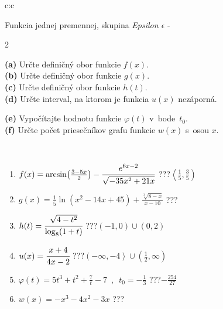 \documentclass[10pt]{report}
\begin{document}
\begin{tabular}{c:c}
\begin{minipage}[c][104.5mm][t]{0.5\linewidth}
\begin{center}
\vspace{7mm}
{\huge Funkcia jednej premennej, skupina \textit{Epsilon $\epsilon$} -}\\[5mm]
\begin{minipage}{0.95\linewidth}
\begin{center}
{\small \begin{multicols}{2} \raggedright
\textbf{(a)} Určte definičný obor funkcie \(f(x)\). \\[1mm]
\textbf{(b)} Určte definičný obor funkcie \(g(x)\). \\[1mm]
\textbf{(c)} Určte definičný obor funkcie \(h(t)\). \\[1mm]
\textbf{(d)} Určte interval, na ktorom je funkcia \(u(x)\) nezáporná. \par \columnbreak
\textbf{(e)} Vypočítajte hodnotu funkcie \(\varphi(t)\) v~bode~\(t_0\). \\[1mm]
\textbf{(f)} Určte počet priesečníkov grafu funkcie \(w(x)\) s~osou \(x\). \\[1mm]
\end{multicols}
}
\end{center}
\end{minipage}
\\[4mm]
\begin{minipage}{0.79\linewidth}
\begin{center}
\begin{varwidth}{\linewidth}
\begin{enumerate}
\small
\item $f(x) = \arcsin\!\left( \frac{3-5x}{2} \right) - \cfrac{e^{6x-2}}{\sqrt{-35x^2+21x}}$\quad \dotfill\; ???\;\dotfill \quad $\left\langle\frac{1}{5} , \frac{3}{5}\right)$
\item $g(x) = \frac{1}{5} \ln{\!(x^2-14x+45)}+\frac{\sqrt[3]{8-x}}{x-10}$\quad \dotfill\; ???\;\dotfill {}
\item $h(t) = \cfrac{\sqrt{4-t^2}}{\log_8(1+t)}$\quad \dotfill\; ???\;\dotfill \quad $\left(-1 , 0\right)\cup\left(0 , 2\right)$
\item $u(x) = \cfrac{x+4}{4x-2}$\quad \dotfill\; ???\;\dotfill \quad $\left(-\infty , -4\right\rangle\cup\left(\frac{1}{2} , \infty\right)$
\item $\varphi(t) = 5t^3+t^2+\frac{7}{t}-7 \enspace , \enspace t_0=-\frac{1}{3}$\quad \dotfill\; ???\;\dotfill \quad $-\frac{254}{27}$
\item $w(x) = -x^3-4x^2-3x$\quad \dotfill\; ???\;\dotfill {}

\end{enumerate}
\end{varwidth}
\end{center}
\end{minipage}
\end{center}
\end{minipage}
\end{tabular}
\end{document}
